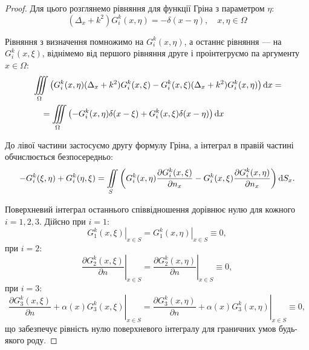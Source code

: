 \begin{proof}
	Для цього розглянемо рівняння для функції Гріна з параметром $\eta$:
	\begin{equation}
		(\Delta_x + k^2) G_i^k(x, \eta) = -\delta(x - \eta), \quad x, \eta \in \Omega
	\end{equation}

	Рівняння з визначення помножимо на $G_i^k(x, \eta)$, а останнє рівняння --- на $G_i^k(x, \xi)$, віднімемо від першого рівняння друге і проінтегруємо па аргументу $x \in \Omega$:
	\begin{equation}
		\begin{aligned}
			& \displaystyle\iiint\limits_\Omega \left( G_i^k(x, \eta) (\Delta_x + k^2) G_i^k(x, \xi) - G_i^k(x, \xi) (\Delta_x + k^2) G_i^k(x, \eta) \right) \mathop{}\!\mathrm{d} x = \\
			& \quad = \displaystyle\iiint\limits_\Omega \left( -G_i^k(x, \eta) \delta(x - \xi) + G_i^k(x, \xi) \delta(x - \eta) \right) \mathop{}\!\mathrm{d} x
		\end{aligned}
	\end{equation}


	До лівої частини застосуємо другу формулу Гріна, а інтеграл в правій частині обчислюється безпосередньо:
	\begin{equation}
		-G_i^k(\xi, \eta) + G_i^k(\eta, \xi) = \displaystyle\iint\limits_S \left( G_i^k(x, \eta) \frac{\partial G_i^k(x, \xi)}{\partial n_x} - G_i^k(x, \xi) \frac{\partial G_i^k(x, \eta)}{\partial n_x} \right) \mathop{}\!\mathrm{d} S_x.
	\end{equation}

	Поверхневий інтеграл останнього співвідношення дорівнює нулю для кожного $i = 1, 2, 3$. Дійсно при $i = 1$:
	\begin{equation}
		\left. G_1^k(x, \xi) \right|_{x \in S} = \left. G_1^k(x, \eta) \right|_{x \in S} \equiv 0,
	\end{equation}
	при $i = 2$:
	\begin{equation}
		\left. \frac{\partial G_2^k(x, \xi)}{\partial n} \right|_{x \in S} = \left. \frac{\partial G_2^k(x, \eta)}{\partial n} \right|_{x \in S} \equiv 0,
	\end{equation}
	при $i = 3$:
	\begin{equation}
		\left. \frac{\partial G_3^k(x, \xi)}{\partial n} + \alpha(x) G_3^k(x, \xi) \right|_{x \in S} = \left. \frac{\partial G_3^k(x, \eta)}{\partial n} + \alpha(x) G_3^k(x, \eta) \right|_{x \in S} \equiv 0,
	\end{equation}
	що забезпечує рівність нулю поверхневого інтегралу для граничних умов будь-якого роду.
\end{proof}

